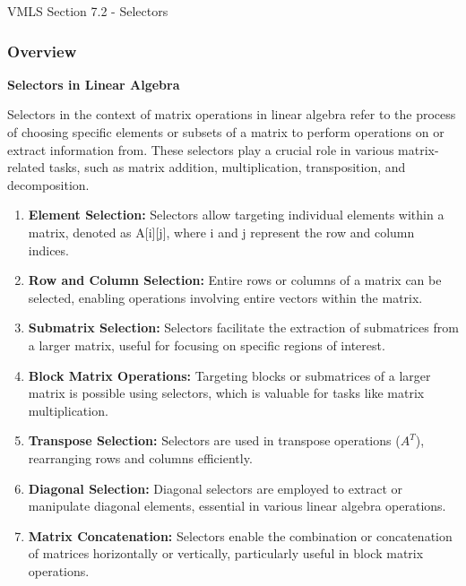 \begin{notes}{VMLS Section 7.2 - Selectors}
    \subsubsection*{Overview}

    \textbf{Selectors in Linear Algebra}

    Selectors in the context of matrix operations in linear algebra refer to the process of choosing specific elements or subsets of a matrix to perform operations on or extract information from. These 
    selectors play a crucial role in various matrix-related tasks, such as matrix addition, multiplication, transposition, and decomposition.

    \begin{enumerate}
        \item \textbf{Element Selection:} Selectors allow targeting individual elements within a matrix, denoted as A[i][j], where i and j represent the row and column indices.
        
        \item \textbf{Row and Column Selection:} Entire rows or columns of a matrix can be selected, enabling operations involving entire vectors within the matrix.
        
        \item \textbf{Submatrix Selection:} Selectors facilitate the extraction of submatrices from a larger matrix, useful for focusing on specific regions of interest.
        
        \item \textbf{Block Matrix Operations:} Targeting blocks or submatrices of a larger matrix is possible using selectors, which is valuable for tasks like matrix multiplication.
        
        \item \textbf{Transpose Selection:} Selectors are used in transpose operations ($A^T$), rearranging rows and columns efficiently.
        
        \item \textbf{Diagonal Selection:} Diagonal selectors are employed to extract or manipulate diagonal elements, essential in various linear algebra operations.
        
        \item \textbf{Matrix Concatenation:} Selectors enable the combination or concatenation of matrices horizontally or vertically, particularly useful in block matrix operations.
        

\end{enumerate}
\end{notes}
